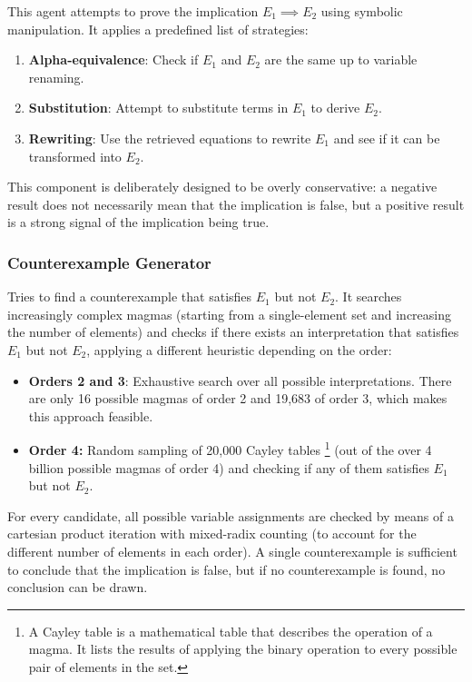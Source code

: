 \documentclass{article}
\begin{document}
This agent attempts to prove the implication \( E_1 \implies E_2 \) using symbolic manipulation. It applies a predefined list of strategies:
\begin{enumerate}
  \item \textbf{Alpha-equivalence}: Check if \( E_1 \) and \( E_2 \) are the same up to variable renaming.
  \item \textbf{Substitution}: Attempt to substitute terms in \( E_1 \) to derive \( E_2 \).
  \item \textbf{Rewriting}: Use the retrieved equations to rewrite \( E_1 \) and see if it can be transformed into \( E_2 \).
\end{enumerate}
This component is deliberately designed to be overly conservative: a negative result does not necessarily mean that the implication is false, but a positive result is a strong signal of the implication being true.

\subsubsection{Counterexample Generator}

Tries to find a counterexample that satisfies \( E_1 \) but not \( E_2 \). It searches increasingly complex magmas (starting from a single-element set and increasing the number of elements) and checks if there exists an interpretation that satisfies \( E_1 \) but not \( E_2 \), applying a different heuristic depending on the order:
\begin{itemize}
  \item \textbf{Orders 2 and 3}: Exhaustive search over all possible interpretations. There are only 16 possible magmas of order 2 and 19,683 of order 3, which makes this approach feasible.
  \item \textbf{Order 4:} Random sampling of 20,000 Cayley tables \footnote{A Cayley table is a mathematical table that describes the operation of a magma. It lists the results of applying the binary operation to every possible pair of elements in the set.} (out of the over 4 billion possible magmas of order 4) and checking if any of them satisfies \( E_1 \) but not \( E_2 \).
\end{itemize}
For every candidate, all possible variable assignments are checked by means of a cartesian product iteration with mixed-radix counting (to account for the different number of elements in each order). A single counterexample is sufficient to conclude that the implication is false, but if no counterexample is found, no conclusion can be drawn.
\end{document}
